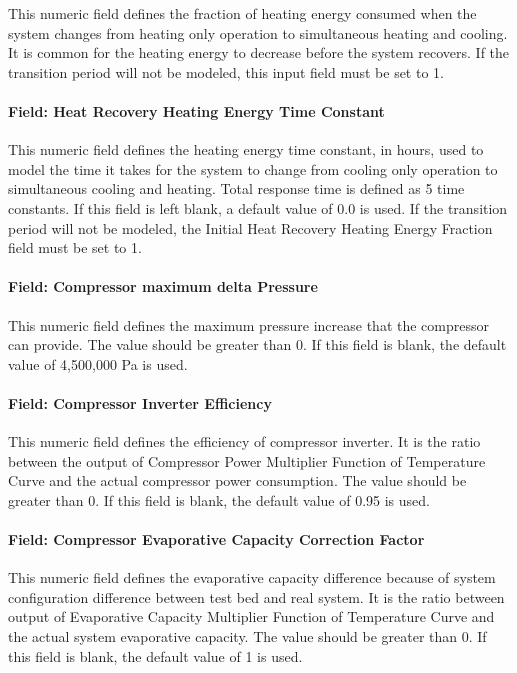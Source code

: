 This numeric field defines the fraction of heating energy consumed when the system changes from heating only operation to simultaneous heating and cooling. It is common for the heating energy to decrease before the system recovers. If the transition period will not be modeled, this input field must be set to 1.

\paragraph{Field: Heat Recovery Heating Energy Time Constant}

This numeric field defines the heating energy time constant, in hours, used to model the time it takes for the system to change from cooling only operation to simultaneous cooling and heating. Total response time is defined as 5 time constants. If this field is left blank, a default value of 0.0 is used. If the transition period will not be modeled, the Initial Heat Recovery Heating Energy Fraction field must be set to 1.

\paragraph{Field: Compressor maximum delta Pressure}

This numeric field defines the maximum pressure increase that the compressor can provide. The value should be greater than 0. If this field is blank, the default value of 4,500,000 Pa is used.

\paragraph{Field: Compressor Inverter Efficiency}

This numeric field defines the efficiency of compressor inverter. It is the ratio between the output of Compressor Power Multiplier Function of Temperature Curve and the actual compressor power consumption. The value should be greater than 0. If this field is blank, the default value of 0.95 is used.

\paragraph{Field: Compressor Evaporative Capacity Correction Factor}

This numeric field defines the evaporative capacity difference because of system configuration difference between test bed and real system. It is the ratio between output of Evaporative Capacity Multiplier Function of Temperature Curve and the actual system evaporative capacity. The value should be greater than 0. If this field is blank, the default value of 1 is used.

